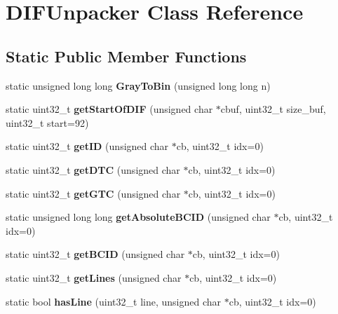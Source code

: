 \section{D\-I\-F\-Unpacker Class Reference}
\label{classDIFUnpacker}
\subsection*{Static Public Member Functions}
\begin{DoxyCompactItemize}
\item 
static unsigned long long {\bfseries Gray\-To\-Bin} (unsigned long long n)\label{classDIFUnpacker_ac74ff0751283b47ec3305e6bd097f205}

\item 
static uint32\-\_\-t {\bfseries get\-Start\-Of\-D\-I\-F} (unsigned char $\ast$cbuf, uint32\-\_\-t size\-\_\-buf, uint32\-\_\-t start=92)\label{classDIFUnpacker_a86b0d092ea83532cff54ab8ef84e6a4d}

\item 
static uint32\-\_\-t {\bfseries get\-I\-D} (unsigned char $\ast$cb, uint32\-\_\-t idx=0)\label{classDIFUnpacker_a4b106d75d0bbe55aaa04543b803c570c}

\item 
static uint32\-\_\-t {\bfseries get\-D\-T\-C} (unsigned char $\ast$cb, uint32\-\_\-t idx=0)\label{classDIFUnpacker_a386f40719e54da21a043aaaa2f99a923}

\item 
static uint32\-\_\-t {\bfseries get\-G\-T\-C} (unsigned char $\ast$cb, uint32\-\_\-t idx=0)\label{classDIFUnpacker_a1c394b50668906c62aa4ffceb17afa64}

\item 
static unsigned long long {\bfseries get\-Absolute\-B\-C\-I\-D} (unsigned char $\ast$cb, uint32\-\_\-t idx=0)\label{classDIFUnpacker_a74793ca664243ae4c8a0208429e4f616}

\item 
static uint32\-\_\-t {\bfseries get\-B\-C\-I\-D} (unsigned char $\ast$cb, uint32\-\_\-t idx=0)\label{classDIFUnpacker_ac76f67110c4bedc0c61aaf8debc40733}

\item 
static uint32\-\_\-t {\bfseries get\-Lines} (unsigned char $\ast$cb, uint32\-\_\-t idx=0)\label{classDIFUnpacker_a2758864b517c88fe23a63d0d4e42ea03}

\item 
static bool {\bfseries has\-Line} (uint32\-\_\-t line, unsigned char $\ast$cb, uint32\-\_\-t idx=0)\label{classDIFUnpacker_aa0bb59ee85f241b4f5e05600315fe2ab}


\end{DoxyCompactItemize}
